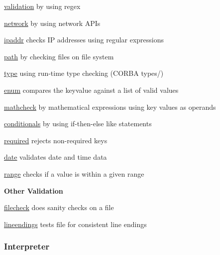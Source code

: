 \begin{DoxyItemize}
\item \hyperlink{md_src_plugins_validation_README_src_plugins_validation_README_md}{validation} by using regex
\item \hyperlink{md_src_plugins_network_README_src_plugins_network_README_md}{network} by using network A\+P\+Is
\item \hyperlink{md_src_plugins_ipaddr_README_src_plugins_ipaddr_README_md}{ipaddr} checks IP addresses using regular expressions
\item \hyperlink{md_src_plugins_path_README_src_plugins_path_README_md}{path} by checking files on file system
\item \hyperlink{md_src_plugins_type_README_src_plugins_type_README_md}{type} using run-\/time type checking (C\+O\+R\+BA types/)
\item \hyperlink{md_src_plugins_enum_README_src_plugins_enum_README_md}{enum} compares the keyvalue against a list of valid values
\item \hyperlink{md_src_plugins_mathcheck_README_src_plugins_mathcheck_README_md}{mathcheck} by mathematical expressions using key values as operands
\item \hyperlink{md_src_plugins_conditionals_README_src_plugins_conditionals_README_md}{conditionals} by using if-\/then-\/else like statements
\item \hyperlink{md_src_plugins_required_README_src_plugins_required_README_md}{required} rejects non-\/required keys
\item \hyperlink{md_src_plugins_date_README_src_plugins_date_README_md}{date} validates date and time data
\item \hyperlink{md_src_plugins_range_README_src_plugins_range_README_md}{range} checks if a value is within a given range
\end{DoxyItemize}

{\bfseries Other Validation}


\begin{DoxyItemize}
\item \hyperlink{md_src_plugins_filecheck_README_src_plugins_filecheck_README_md}{filecheck} does sanity checks on a file
\item \hyperlink{md_src_plugins_lineendings_README_src_plugins_lineendings_README_md}{lineendings} tests file for consistent line endings
\end{DoxyItemize}

\subsubsection*{Interpreter}

